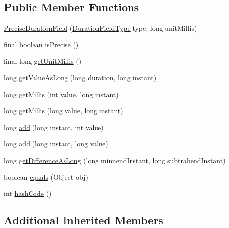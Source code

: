 \subsection*{Public Member Functions}
\begin{DoxyCompactItemize}
\item 
\hyperlink{classorg_1_1joda_1_1time_1_1field_1_1_precise_duration_field_adce098c59dfe0232a1a137bbb1cc73b2}{Precise\-Duration\-Field} (\hyperlink{classorg_1_1joda_1_1time_1_1_duration_field_type}{Duration\-Field\-Type} type, long unit\-Millis)
\item 
final boolean \hyperlink{classorg_1_1joda_1_1time_1_1field_1_1_precise_duration_field_a680625ae950384e9221c7af9b08e8cec}{is\-Precise} ()
\item 
final long \hyperlink{classorg_1_1joda_1_1time_1_1field_1_1_precise_duration_field_a21686021dd6d07041e0fbe93b82294d8}{get\-Unit\-Millis} ()
\item 
long \hyperlink{classorg_1_1joda_1_1time_1_1field_1_1_precise_duration_field_adc63153af0bec8df0a38bf3dc91d2635}{get\-Value\-As\-Long} (long duration, long instant)
\item 
long \hyperlink{classorg_1_1joda_1_1time_1_1field_1_1_precise_duration_field_a9cf6328c0dd3cd6e08ee30c01a814ef0}{get\-Millis} (int value, long instant)
\item 
long \hyperlink{classorg_1_1joda_1_1time_1_1field_1_1_precise_duration_field_a465e274161b15ab00c4e42c132113804}{get\-Millis} (long value, long instant)
\item 
long \hyperlink{classorg_1_1joda_1_1time_1_1field_1_1_precise_duration_field_adfe6961b200e38058488d25d8d8ed99d}{add} (long instant, int value)
\item 
long \hyperlink{classorg_1_1joda_1_1time_1_1field_1_1_precise_duration_field_a6b82325897d2d047277999a9fd447350}{add} (long instant, long value)
\item 
long \hyperlink{classorg_1_1joda_1_1time_1_1field_1_1_precise_duration_field_abf35ad835c05b104a0e2467f1f5a8850}{get\-Difference\-As\-Long} (long minuend\-Instant, long subtrahend\-Instant)
\item 
boolean \hyperlink{classorg_1_1joda_1_1time_1_1field_1_1_precise_duration_field_acce8bc28980a6407f5d911958af46974}{equals} (Object obj)
\item 
int \hyperlink{classorg_1_1joda_1_1time_1_1field_1_1_precise_duration_field_a450479d5a6631fc3f05dffccc9719055}{hash\-Code} ()
\end{DoxyCompactItemize}
\subsection*{Additional Inherited Members}


